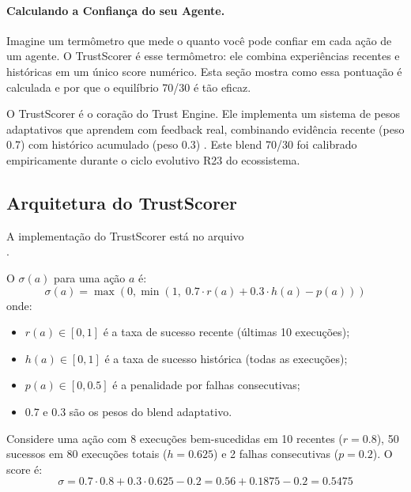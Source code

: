 \paragraph{Calculando a Confiança do seu Agente.}
Imagine um termômetro que mede o quanto você pode confiar em
cada ação de um agente. O TrustScorer é esse termômetro:
ele combina experiências recentes e históricas em um único
score numérico. Esta seção mostra como essa pontuação é
calculada e por que o equilíbrio 70/30 é tão eficaz.

O TrustScorer é o coração do Trust Engine. Ele implementa um sistema
de pesos adaptativos que aprendem com feedback real, combinando
evidência recente (peso 0.7) com histórico acumulado (peso 0.3)
\cite{opencode2026spec038}. Este blend 70/30 foi calibrado
empiricamente durante o ciclo evolutivo R23 do ecossistema.

\subsection{Arquitetura do TrustScorer}

A implementação do TrustScorer está no arquivo \\%
\hspace*{2em}.

\begin{definicao}
O  $\sigma(a)$ para uma ação $a$ é:
\[
\sigma(a) = \max\left(0, \min\left(1,\; 0.7 \cdot r(a) + 0.3 \cdot
h(a) - p(a)\right)\right)
\]
onde:
\begin{itemize}
\item $r(a) \in [0,1]$ é a taxa de sucesso recente (últimas 10
execuções);
\item $h(a) \in [0,1]$ é a taxa de sucesso histórica (todas as
execuções);
\item $p(a) \in [0, 0.5]$ é a penalidade por falhas consecutivas;
\item $0.7$ e $0.3$ são os pesos do blend adaptativo.
\end{itemize}
\end{definicao}

\begin{exemplo}
Considere uma ação com 8 execuções bem-sucedidas em 10 recentes
($r = 0.8$), 50 sucessos em 80 execuções totais ($h = 0.625$) e 2
falhas consecutivas ($p = 0.2$). O score é:
\[
\sigma = 0.7 \cdot 0.8 + 0.3 \cdot 0.625 - 0.2 = 0.56 + 0.1875 - 0.2
= 0.5475
\]
\end{exemplo}

